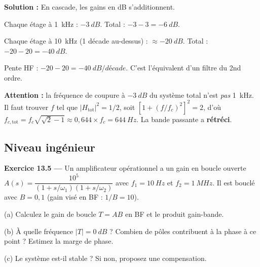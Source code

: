 \documentclass[12pt,a4paper,twoside]{book}
\begin{document}
\begin{pratique}
\textbf{Solution :} En cascade, les gains en dB s'additionnent.

Chaque étage à \SI{1}{kHz} : $\SI{-3}{dB}$. Total : $-3-3 = \SI{-6}{dB}$.

Chaque étage à \SI{10}{kHz} (1 décade au-dessus) : $\approx\SI{-20}{dB}$. Total : $-20-20 = \SI{-40}{dB}$.

Pente HF : $-20 - 20 = -\SI{40}{dB/décade}$. C'est l'équivalent d'un filtre du 2nd ordre.

\textbf{Attention :} la fréquence de coupure à $\SI{-3}{dB}$ du système total n'est \textit{pas} \SI{1}{kHz}. Il faut trouver $f$ tel que $|H_{\text{tot}}|^2 = 1/2$, soit $[1+(f/f_c)^2]^2 = 2$, d'où $f_{c,\text{tot}} = f_c\sqrt{\sqrt{2}-1} \approx 0{,}644\times f_c = \SI{644}{Hz}$. La bande passante a \textbf{rétréci}.
\end{pratique}

\subsection*{Niveau ingénieur}

\textbf{Exercice 13.5 ---} Un amplificateur opérationnel a un gain en boucle ouverte $A(s) = \dfrac{10^5}{(1+s/\omega_1)(1+s/\omega_2)}$ avec $f_1 = \SI{10}{Hz}$ et $f_2 = \SI{1}{MHz}$. Il est bouclé avec $B = 0{,}1$ (gain visé en BF : $1/B = 10$).

(a) Calculez le gain de boucle $T = AB$ en BF et le produit gain-bande.

(b) À quelle fréquence $|T| = \SI{0}{dB}$ ? Combien de pôles contribuent à la phase à ce point ? Estimez la marge de phase.

(c) Le système est-il stable ? Si non, proposez une compensation.
\end{document}
